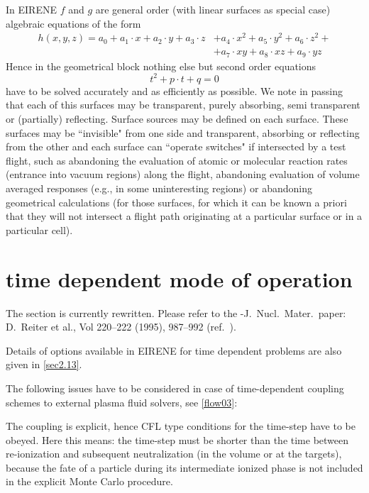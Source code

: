 In EIRENE $f$ and $g$ are general  order (with linear surfaces as
special case) algebraic equations of the form
\begin{align}
  h(x,y,z) = a_0   +
  a_1  \cdot  x	 + a_2	 \cdot	y   + a_3  \cdot	z & + a_4  \cdot  x^2
  +   a_5  \cdot	y^2	+ a_6  \cdot  z^2   +  \nonumber              \\
                                             & +
  a_7  \cdot  xy	 +   a_8  \cdot  xz   +
  a_9  \cdot  yz \label{eq1.36}
\end{align}
Hence in the geometrical block nothing else but second order equations
\begin{equation}
  \nonumber t^2	 +   p \cdot  t   +   q = 0
\end{equation}
have
to be solved accurately and as efficiently as possible.
We note in passing that each of this surfaces may be transparent, purely
absorbing, semi transparent or (partially) reflecting.
Surface sources may be defined on each surface.
These surfaces may be ``invisible" from one side and transparent, absorbing or
reflecting from the other and each surface can ``operate switches" if
intersected by a test flight, such as abandoning the evaluation of atomic or
molecular reaction rates (entrance into vacuum regions) along the flight,
abandoning evaluation of volume averaged responses (e.g., in some uninteresting
regions) or abandoning geometrical calculations (for those surfaces, for which
it can be known a priori that they will not intersect a flight path originating
at a particular surface or in a particular cell).

\newpage

\section{time dependent mode of operation} \label{sec1.6}

The section is currently rewritten.
Please refer to the -J.~Nucl.~Mater.\ paper: D.~Reiter et al., Vol 220--222
(1995), 987--992 (ref.\ \cite{kn:Reiter94}).

Details of options available in EIRENE for time dependent problems are also
given in \cref{sec2.13}.

The following issues have to be considered in case of time-dependent coupling
schemes to external plasma fluid solvers, see \cref{flow03}:

The coupling is explicit, hence \ac{CFL} type conditions for the time-step have
to be obeyed.
Here this means: the time-step must be shorter than the time between
re-ionization and subsequent neutralization (in the volume or at the targets),
because the fate of a particle during its intermediate ionized phase is not
included in the explicit Monte Carlo procedure.

